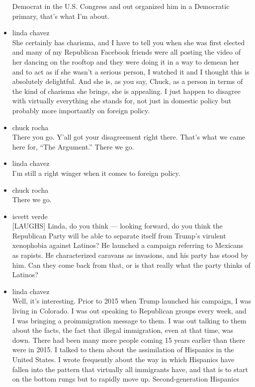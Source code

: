\begin{itemize}
  Democrat in the U.S. Congress and out organized him in a Democratic
  primary, that's what I'm about.
\item
  linda chavez\\
  She certainly has charisma, and I have to tell you when she was first
  elected and many of my Republican Facebook friends were all posting
  the video of her dancing on the rooftop and they were doing it in a
  way to demean her and to act as if she wasn't a serious person, I
  watched it and I thought this is absolutely delightful. And she is, as
  you say, Chuck, as a person in terms of the kind of charisma she
  brings, she is appealing. I just happen to disagree with virtually
  everything she stands for, not just in domestic policy but probably
  more importantly on foreign policy.
\item
  chuck rocha\\
  There you go. Y'all got your disagreement right there. That's what we
  came here for, ``The Argument.'' There we go.
\item
  linda chavez\\
  I'm still a right winger when it comes to foreign policy.
\item
  chuck rocha\\
  There we go.
\item
  isvett verde\\
  {[}LAUGHS{]} Linda, do you think --- looking forward, do you think the
  Republican Party will be able to separate itself from Trump's virulent
  xenophobia against Latinos? He launched a campaign referring to
  Mexicans as rapists. He characterized caravans as invasions, and his
  party has stood by him. Can they come back from that, or is that
  really what the party thinks of Latinos?
\item
  linda chavez\\
  Well, it's interesting. Prior to 2015 when Trump launched his
  campaign, I was living in Colorado. I was out speaking to Republican
  groups every week, and I was bringing a proimmigration message to
  them. I was out talking to them about the facts, the fact that illegal
  immigration, even at that time, was down. There had been many more
  people coming 15 years earlier than there were in 2015. I talked to
  them about the assimilation of Hispanics in the United States. I wrote
  frequently about the way in which Hispanics have fallen into the
  pattern that virtually all immigrants have, and that is to start on
  the bottom rungs but to rapidly move up. Second-generation Hispanics

\end{itemize}
